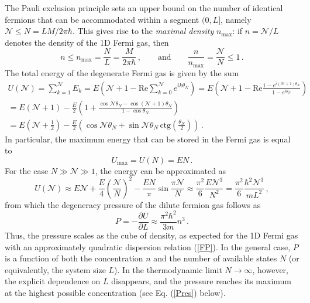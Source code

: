\documentclass[12pt,a4paper]{article}
\numberwithin{equation}{section}
\theoremstyle{theorem}
\theoremstyle{remark}
\begin{document}
The Pauli exclusion principle sets an upper bound on the number of identical fermions that can be accommodated within a segment $(0, L]$, namely 
$\mathcal{N}\leq N=LM/2\pi \hbar$.  This gives rise to the {\it maximal density} $n_{\mathrm{max}}$: if $n=\mathcal{N}/L$ denotes the density of the 1D Fermi gas, then  
\begin{equation}
    n\leq n_{\mathrm{max}}=\frac{N}{L}=\frac{M}{2\pi \hbar}\,,\qquad \mbox{and}\qquad \frac{n}{n_{\mathrm{max}}}=\frac{\mathcal{N}}{N}\leq 1\,.
\end{equation}
The total energy of the degenerate Fermi gas is given by the sum 
\begin{equation}\label{Uex}
\begin{array}{c}
  \displaystyle  U(\mathcal{N})=\sum_{k=1}^{\mathcal{N}}E_k=E\left(\mathcal{N}+1-\mathrm{Re}\sum_{k=0}^{\mathcal{N}} e^{ik\theta_N}\right)=E\left(\mathcal{N}+1-\mathrm{Re}\frac{1-e^{i(\mathcal{N}+1)\theta_N}}{1-e^{i\theta_N}}\right)\\[7mm]
  \displaystyle  =E(\mathcal{N}+1)-\frac E2\left(1+\frac{\cos {\mathcal{N}\theta_N} -\cos(\mathcal{N}+1)\theta_N}{1-\cos{\theta_N}}\right)\\[7mm]\displaystyle =E\left(\mathcal{N}+\frac12\right) -\frac E2\left( \cos{\mathcal{N}\theta_N}+\sin\mathcal{N}\theta_N\,\mathrm{ctg}\left(\frac{\theta_N}{2}\right)\right)\,.   
    \end{array}
\end{equation}
In particular, the maximum energy that can be stored in the Fermi gas is equal to   $$U_{\mathrm{max}}=U({N})=E{N}\,.$$ For the case
$N\gg \mathcal{N} \gg 1$, the energy can be approximated as
\begin{equation}
    U(\mathcal{N})\approx E\mathcal{N}+\frac E4\left(\frac{\mathcal{N}}{N}\right)^2-\frac{EN}{\pi}\sin\frac{\pi \mathcal{N}}{N} \approx \frac{\pi^2}6 \frac{E\mathcal{N}^3}{N^2}=\frac{\pi^2}{6}\frac{\hbar^2\mathcal{N}^3}{m L^2}\,,
\end{equation}
from which the degeneracy pressure of the dilute fermion gas follows as
\begin{equation}\label{n3}
    P=-\frac{\partial U}{\partial L}\approx\frac{\pi^2\hbar^2}{3m} n^3\,. 
\end{equation}
Thus, the pressure scales as the cube of density, as expected for the 1D Fermi gas with an approximately quadratic dispersion relation (\ref{FP}). In the general case, $P$ is a function of both the concentration $n$ and the number of available states $N$ (or equivalently, the system size $L$). In the thermodynamic limit $N\rightarrow \infty$, however, the explicit dependence on $L$ disappears, and the pressure reaches its maximum at the highest possible concentration (see Eq. (\ref{Pres}) below).  
\end{document}
